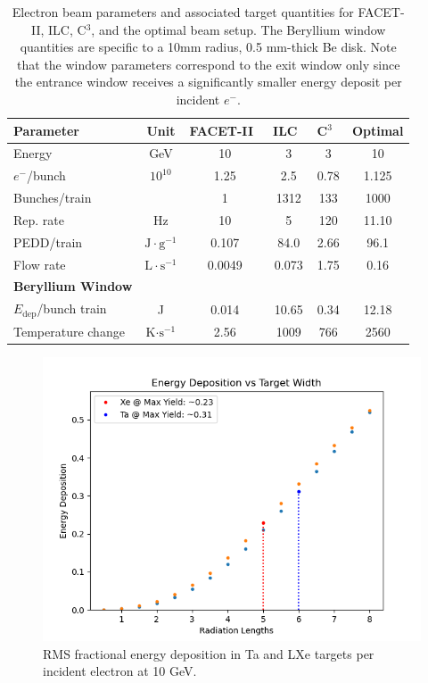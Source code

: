 \documentclass[
reprint,
nofootinbib,
amsmath, amssymb,
aps,
floatfix,
]{revtex4-2}
\begin{document}
\begin{table}
    \centering
    \begin{tabular}{lccccc}
        \hline \hline
        \textbf{Parameter} & \textbf{Unit} & \textbf{FACET-II}~\cite{FACET2016} & \textbf{ILC}~\cite{Nagoshi2020} & \textbf{C$^3$}~\cite{Bai2021} & \textbf{Optimal} \\
        \hline
        Energy & GeV & 10 & 3 & 3 & 10 \\
        $e^-$/bunch & $10^{10}$ & 1.25 & 2.5 & 0.78 & 1.125 \\
        Bunches/train & & 1 & 1312 & 133 & 1000 \\
        Rep. rate & Hz & 10 & 5 & 120 & 11.10 \\
        PEDD/train & $\textrm{J}\cdot\textrm{g}^{-1}$ & 0.107 & 84.0 & 2.66 & 96.1 \\
        Flow rate & $\textrm{L}\cdot\textrm{s}^{-1}$ & 0.0049 & 0.073 & 1.75 & 0.16 \\
    \hline \hline
    \textbf{Beryllium Window} \\
        $E_{\textrm{dep}}$/bunch train & J &  0.014 & 10.65 & 0.34 & 12.18 \\
        Temperature change & K$\cdot \textrm{s}^{-1}$ & 2.56 & 1009 & 766 & 2560 \\
    \hline \hline
    \end{tabular}
    \caption{\label{tab:BeamInfo}Electron beam parameters and associated target quantities for FACET-II, ILC, C$^3$, and the optimal beam setup.
    The Beryllium window quantities are specific to a 10mm radius, 0.5 mm-thick Be disk.  Note that the window parameters
    correspond to the exit window only since the entrance window receives a significantly smaller energy deposit per incident $e^-$.}
\end{table}

\begin{figure}[H]
    \includegraphics[width = \linewidth]{../images/CompDeps.png}
    \caption{\label{fig:EDep}RMS fractional energy deposition in Ta and LXe targets per incident electron at 10 GeV.}
\end{figure}
\end{document}
